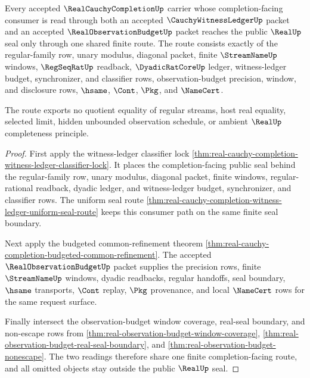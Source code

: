 \begin{theorem}
\label{thm:real-cauchy-completion-witness-ledger-observation-budget-route}
Every accepted $\RealCauchyCompletionUp$ carrier whose completion-facing consumer is read through both an accepted $\CauchyWitnessLedgerUp$ packet and an accepted $\RealObservationBudgetUp$ packet reaches the public $\RealUp$ seal only through one shared finite route. The route consists exactly of the regular-family row, unary modulus, diagonal packet, finite $\StreamNameUp$ windows, $\RegSeqRatUp$ readback, $\DyadicRatCoreUp$ ledger, witness-ledger budget, synchronizer, and classifier rows, observation-budget precision, window, and disclosure rows, $\hsame$, $\Cont$, $\Pkg$, and $\NameCert$.

The route exports no quotient equality of regular streams, host real equality, selected limit, hidden unbounded observation schedule, or ambient $\RealUp$ completeness principle.
\end{theorem}
\begin{proof}
First apply the witness-ledger classifier lock \autoref{thm:real-cauchy-completion-witness-ledger-classifier-lock}. It places the completion-facing public seal behind the regular-family row, unary modulus, diagonal packet, finite windows, regular-rational readback, dyadic ledger, and witness-ledger budget, synchronizer, and classifier rows. The uniform seal route \autoref{thm:real-cauchy-completion-witness-ledger-uniform-seal-route} keeps this consumer path on the same finite seal boundary.

Next apply the budgeted common-refinement theorem \autoref{thm:real-cauchy-completion-budgeted-common-refinement}. The accepted $\RealObservationBudgetUp$ packet supplies the precision rows, finite $\StreamNameUp$ windows, dyadic readbacks, regular handoffs, seal boundary, $\hsame$ transports, $\Cont$ replay, $\Pkg$ provenance, and local $\NameCert$ rows for the same request surface.

Finally intersect the observation-budget window coverage, real-seal boundary, and non-escape rows from \autoref{thm:real-observation-budget-window-coverage}, \autoref{thm:real-observation-budget-real-seal-boundary}, and \autoref{thm:real-observation-budget-nonescape}. The two readings therefore share one finite completion-facing route, and all omitted objects stay outside the public $\RealUp$ seal.
\end{proof}

